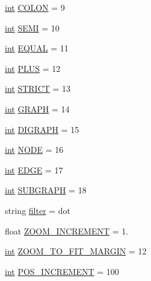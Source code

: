 \begin{DoxyCompactItemize}
\item 
\hyperlink{classint}{int} \hyperlink{namespacesmacc__viewer_1_1xdot_1_1xdot__qt_abe43e930f56b018f7dc671b85e870d27}{C\+O\+L\+ON} = 9
\item 
\hyperlink{classint}{int} \hyperlink{namespacesmacc__viewer_1_1xdot_1_1xdot__qt_a8c45fc304e8a628f85cb5d3c0b3a2399}{S\+E\+MI} = 10
\item 
\hyperlink{classint}{int} \hyperlink{namespacesmacc__viewer_1_1xdot_1_1xdot__qt_a5c5f99e459885969ed1110510f6aa63f}{E\+Q\+U\+AL} = 11
\item 
\hyperlink{classint}{int} \hyperlink{namespacesmacc__viewer_1_1xdot_1_1xdot__qt_a8b8e5a4bd6d9a07549b40fd222cf15b2}{P\+L\+US} = 12
\item 
\hyperlink{classint}{int} \hyperlink{namespacesmacc__viewer_1_1xdot_1_1xdot__qt_a927da4336a8a38bb4819afd08a6036d6}{S\+T\+R\+I\+CT} = 13
\item 
\hyperlink{classint}{int} \hyperlink{namespacesmacc__viewer_1_1xdot_1_1xdot__qt_a33cc1b110ff8e2a7fe260d915fbaf6d0}{G\+R\+A\+PH} = 14
\item 
\hyperlink{classint}{int} \hyperlink{namespacesmacc__viewer_1_1xdot_1_1xdot__qt_a5ced3213c63b1c0deccb1133553959c5}{D\+I\+G\+R\+A\+PH} = 15
\item 
\hyperlink{classint}{int} \hyperlink{namespacesmacc__viewer_1_1xdot_1_1xdot__qt_ab3037fa9e7af62e853f743e1bab0285e}{N\+O\+DE} = 16
\item 
\hyperlink{classint}{int} \hyperlink{namespacesmacc__viewer_1_1xdot_1_1xdot__qt_ab75bc047150f1d866748d463de5ad4f3}{E\+D\+GE} = 17
\item 
\hyperlink{classint}{int} \hyperlink{namespacesmacc__viewer_1_1xdot_1_1xdot__qt_afb8df3443e998785b9a777725f889afb}{S\+U\+B\+G\+R\+A\+PH} = 18
\item 
string \hyperlink{namespacesmacc__viewer_1_1xdot_1_1xdot__qt_a3e281a7b487568916dc614e2edd9f120}{filter} = \textquotesingle{}dot\textquotesingle{}
\item 
float \hyperlink{namespacesmacc__viewer_1_1xdot_1_1xdot__qt_afe0fd0e6353c1bf45deab0c2906eb06a}{Z\+O\+O\+M\+\_\+\+I\+N\+C\+R\+E\+M\+E\+NT} = 1.
\item 
\hyperlink{classint}{int} \hyperlink{namespacesmacc__viewer_1_1xdot_1_1xdot__qt_aff361a5ddb95dd45c48edb5224f6f218}{Z\+O\+O\+M\+\_\+\+T\+O\+\_\+\+F\+I\+T\+\_\+\+M\+A\+R\+G\+IN} = 12
\item 
\hyperlink{classint}{int} \hyperlink{namespacesmacc__viewer_1_1xdot_1_1xdot__qt_ac9afe7a4efc515b9800786f0fe13e131}{P\+O\+S\+\_\+\+I\+N\+C\+R\+E\+M\+E\+NT} = 100

\end{DoxyCompactItemize}
